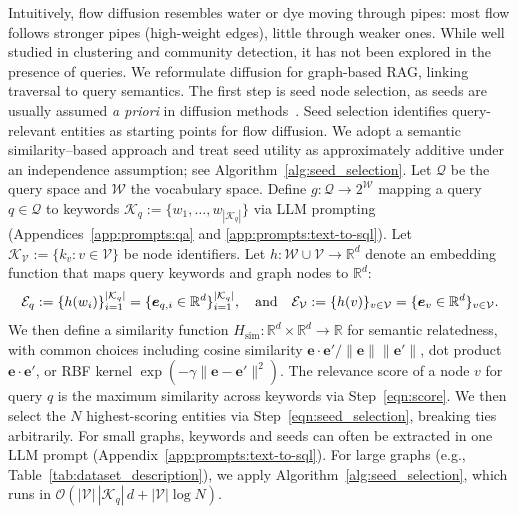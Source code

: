\documentclass{article} %
\begin{document}
%
Intuitively, flow diffusion resembles water or dye moving through pipes: most flow follows stronger pipes (high-weight edges), little through weaker ones. While well studied in clustering and community detection, it has not been explored in the presence of queries. We reformulate diffusion for graph-based RAG, linking traversal to query semantics. The first step is seed node selection, as seeds are usually assumed \textit{a priori} in diffusion methods~\citep{spielman2013local,WFHM2017}. Seed selection identifies query-relevant entities as starting points for flow diffusion.  
We adopt a semantic similarity--based approach and treat seed utility as approximately additive under an independence assumption; see Algorithm~\ref{alg:seed_selection}.  Let $\mathcal{Q}$ be the query space and $\mathcal{W}$ the vocabulary space. Define $g: \mathcal{Q} \rightarrow 2^{\mathcal{W}}$ mapping a query $q \in \mathcal{Q}$ to keywords $\mathcal{K}_q := \{w_1, \ldots, w_{|\mathcal{K}_q|}\}$ via LLM prompting (Appendices~\ref{app:prompts:qa} and \ref{app:prompts:text-to-sql}). 
Let $\mathcal{K}_{\mathcal{V}} := \{k_v : v \in \mathcal{V}\}$ be node identifiers. Let $h:\mathcal{W}\cup\mathcal{V}\rightarrow\mathbb{R}^d$ denote an embedding function that maps query keywords and graph nodes to $\mathbb{R}^d$:
\begin{align*}
\mathcal{E}_q 
:= \{h(w_i)\}_{i=1}^{|\mathcal{K}_q|}
 = \{\boldsymbol{e}_{q,i}\in\mathbb{R}^d\}_{i=1}^{|\mathcal{K}_q|}, \quad\textnormal{and}\quad  
\mathcal{E}_{\mathcal{V}}  
:= \{h(v)\}_{v\in\mathcal{V}}
 = \{\boldsymbol{e}_v\in\mathbb{R}^d\}_{v\in\mathcal{V}}.
\end{align*}
We then define a similarity function $H_{\text{sim}}: \mathbb{R}^d \times \mathbb{R}^d \rightarrow \mathbb{R}$ for semantic relatedness, with common choices including cosine similarity $\boldsymbol{e} \cdot \boldsymbol{e}' /\|\boldsymbol{e}\| \|\boldsymbol{e}'\|$, dot product $\boldsymbol{e} \cdot \boldsymbol{e}'$, or RBF kernel $\exp(-\gamma \|\boldsymbol{e} - \boldsymbol{e}'\|^2)$.  
The relevance score of a node $v$ for query $q$ is the maximum similarity across keywords via  Step~\ref{eqn:score}. We then select the $N$ highest-scoring entities via Step~\ref{eqn:seed_selection}, breaking ties arbitrarily. For small graphs, keywords and seeds can often be extracted in one LLM prompt (Appendix~\ref{app:prompts:text-to-sql}).  For large graphs (e.g., Table~\ref{tab:dataset_description}), we apply Algorithm~\ref{alg:seed_selection}, which runs in $\mathcal{O}\!\left(|\mathcal{V}|\,|\mathcal{K}_q|\,d + |\mathcal{V}|\log N\right)$.
\end{document}
